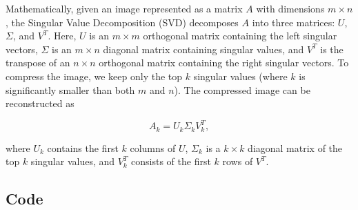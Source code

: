 \documentclass[
  journal,
]{IEEEtran}%
\begin{document}
Mathematically, given an image represented as a matrix \(A\) with
dimensions \(m \times n\), the Singular Value Decomposition (SVD)
decomposes \(A\) into three matrices: \(U\), \(\Sigma\), and \(V^T\).
Here, \(U\) is an \(m \times m\) orthogonal matrix containing the left
singular vectors, \(\Sigma\) is an \(m \times n\) diagonal matrix
containing singular values, and \(V^T\) is the transpose of an
\(n \times n\) orthogonal matrix containing the right singular vectors.
To compress the image, we keep only the top \(k\) singular values (where
\(k\) is significantly smaller than both \(m\) and \(n\)). The
compressed image can be reconstructed as

\[
A_k = U_k \Sigma_k V_k^T,
\]

where \(U_k\) contains the first \(k\) columns of \(U\), \(\Sigma_k\) is
a \(k \times k\) diagonal matrix of the top \(k\) singular values, and
\(V_k^T\) consists of the first \(k\) rows of \(V^T\).

\subsection{Code}
\end{document}

